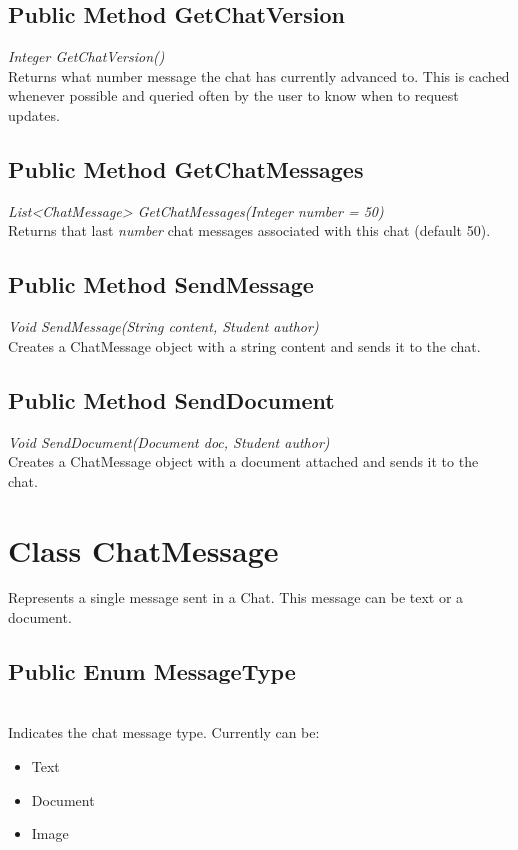 \documentclass{scrreprt}
\begin{document}
\subsection{Public Method GetChatVersion}
\textit{Integer GetChatVersion()} \\
Returns what number message the chat has currently advanced to. This is cached whenever possible and queried often by the user to know when to request updates.

\subsection{Public Method GetChatMessages}
\textit{List<ChatMessage> GetChatMessages(Integer number = 50)} \\
Returns that last \textit{number} chat messages associated with this chat (default 50).

\subsection{Public Method SendMessage}
\textit{Void SendMessage(String content, Student author)} \\
Creates a ChatMessage object with a string content and sends it to the chat.

\subsection{Public Method SendDocument}
\textit{Void SendDocument(Document doc, Student author)} \\
Creates a ChatMessage object with a document attached and sends it to the chat.

\section{Class ChatMessage}
Represents a single message sent in a Chat. This message can be text or a document.

\subsection{Public Enum MessageType}
\textit{} \\
Indicates the chat message type. Currently can be:
\begin{itemize}
	\item Text
	\item Document
	\item Image
\end{itemize}
\end{document}
